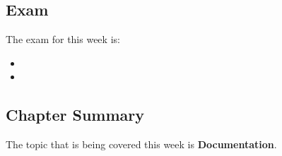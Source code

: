 \newpage

\subsection{Exam}

The exam for this week is:

\begin{itemize}
    \item {}
    \item {}
\end{itemize}

\newpage

\subsection{Chapter Summary}

The topic that is being covered this week is \textbf{Documentation}.

